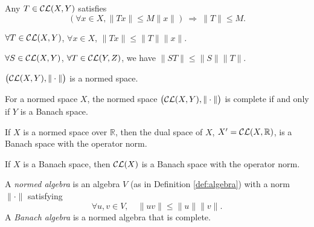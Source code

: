 \begin{lem}
  \label{lem:opNormIsLeastUpperBound}
  Any $T\in {\cal CL}(X,Y)$ satisfies 
  \begin{equation}
    \label{eq:opNormIsLeastUpperBound}
    \left(\forall x\in X, \|Tx\|\le M \|x\|\right)
    \ \Rightarrow\ \|T\|\le M.
  \end{equation}
\end{lem}

\begin{lem}
  \label{lem:TxNormLE-Tnorm-xnorm}
  $\forall T\in {\cal CL}(X,Y)$, $\forall x\in X$,
  $\|Tx\|\le \|T\|\|x\|$.
\end{lem}

\begin{lem}
  \label{lem:STNormLE-SnormTnorm}
  $\forall S\in {\cal CL}(X,Y)$,
  $\forall T\in {\cal CL}(Y,Z)$, 
  we have $\|ST\|\le \|S\|\|T\|$.
\end{lem}

\begin{thm}
  \label{thm:OpNormCLXY}
  $\bigl({\cal CL}(X,Y), \|\cdot\|\bigr)$ is a normed space.
\end{thm}

\begin{lem}
  \label{lem:YisBanachImpliesCLXYisBanach}
  For a normed space $X$,
  the normed space \mbox{$\bigl({\cal CL}(X,Y), \|\cdot\|\bigr)$} is complete
  if and only if $Y$ is a Banach space.
\end{lem}

\begin{coro}
  If $X$ is a normed space over $\mathbb{R}$,
  then the dual space of $X$, $X'={\cal CL}(X,\mathbb{R})$,
  is a Banach space with the operator norm.
\end{coro}

\begin{coro}
  \label{coro:XisBanachSoIsCLX}
  If $X$ is a Banach space,
  then ${\cal CL}(X)$ is a Banach space with the operator norm.
\end{coro}

\begin{defn}
  A \emph{normed algebra} is an algebra $V$ (as in Definition \ref{def:algebra})
  with a norm $\|\cdot\|$ satisfying
  \begin{equation}
    \label{eq:normedAlgebra}
    \forall u,v \in V,\quad \|uv\|\le \|u\|\|v\|.
  \end{equation}
  A \emph{Banach algebra} is a normed algebra that is complete.
\end{defn}

